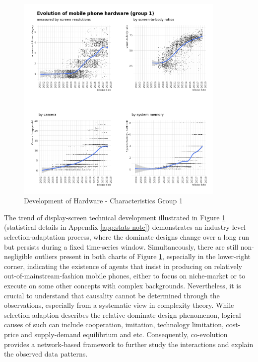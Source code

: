 \documentclass[utf8,english]{gradu3}
\begin{document}
\begin{figure}[htb]
    \centering
    \includegraphics[width=0.90\textwidth]{evo1.png}
    \caption{Development of Hardware - Characteristics Group 1}
    \label{fig:screen resolutions}
\end{figure}

The trend of display-screen technical development illustrated in Figure \ref{fig:screen resolutions} (statistical details in Appendix \ref{app:stats note}) demonstrates an industry-level selection-adaptation process, where the dominate designs change over a long run but persists during a fixed time-series window. Simultaneously, there are still non-negligible outliers present in both charts of Figure \ref{fig:screen resolutions}, especially in the lower-right corner, indicating the existence of agents that insist in producing on relatively out-of-mainstream-fashion mobile phones, either to focus on niche-market or to execute on some other concepts with complex backgrounds. Nevertheless, it is crucial to understand that causality cannot be determined through the observations, especially from a systematic view in complexity theory. While selection-adaption describes the relative dominate design phenomenon, logical causes of such can include cooperation, imitation, technology limitation, cost-price and supply-demand equilibrium and etc. Consequently, co-evolution provides a network-based framework to further study the interactions and explain the observed data patterns.
\end{document}
